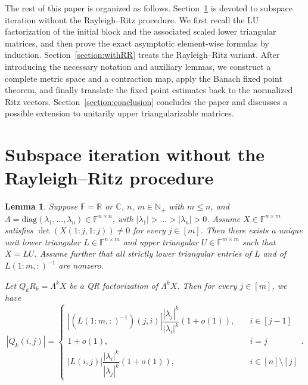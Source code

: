 \documentclass[11pt,a4paper]{article}
\theoremstyle{plain}              %
\newtheorem{lemma}[theorem]{Lemma}
\theoremstyle{definition}         %
\begin{document}
The rest of this paper is organized as follows. Section~\ref{section:withoutRR} is devoted to subspace iteration without the Rayleigh--Ritz procedure. We first recall the LU factorization of the initial block and the associated scaled lower triangular matrices, and then prove the exact asymptotic element-wise formulas by induction. Section~\ref{section:withRR} treats the Rayleigh--Ritz variant. After introducing the necessary notation and auxiliary lemmas, we construct a complete metric space and a contraction map, apply the Banach fixed point theorem, and finally translate the fixed point estimates back to the normalized Ritz vectors. Section~\ref{section:conclusion} concludes the paper and discusses a possible extension to unitarily upper triangularizable matrices.

\section{Subspace iteration without the Rayleigh--Ritz procedure}\label{section:withoutRR}

\begin{lemma}\label{lemma:withoutRR}
Suppose \(\mathbb{F}=\mathbb{R}\) or \(\mathbb{C}\), \(n\), \(m\in\mathbb{N}_+\) with \(m\leq n\), and \(\Lambda=\mathrm{diag}(\lambda_1,\dots,\lambda_n)\in\mathbb{F}^{n\times n}\), with \(|\lambda_1|>\dots>|\lambda_n|>0\). Assume \(X\in\mathbb{F}^{n\times m}\) satisfies \(\det(X(1:j,1:j))\neq 0\) for every \(j\in[m]\). Then there exists a unique unit lower triangular \(L\in\mathbb{F}^{n\times m}\) and upper triangular \(U\in\mathbb{F}^{m\times m}\) such that \(X=LU\). Assume further that all strictly lower triangular entries of \(L\) and of \(L(1:m,:)^{-1}\) are nonzero.

Let \(Q_kR_k=\Lambda^k X\) be a QR factorization of \(\Lambda^kX\). Then for every \(j\in[m]\), we have
\[
|Q_k(i,j)|=\begin{cases}
|(L(1:m,:)^{-1})(j,i)|\dfrac{|\lambda_j|^k}{|\lambda_i|^k}(1+o(1)),\quad&i\in[j-1]\\
1+o(1),\quad&i=j\\
|L(i,j)|\dfrac{|\lambda_i|^k}{|\lambda_j|^k}(1+o(1)),\quad&i\in[n]\setminus[j]
\end{cases}.
\]
\end{lemma}
\end{document}
